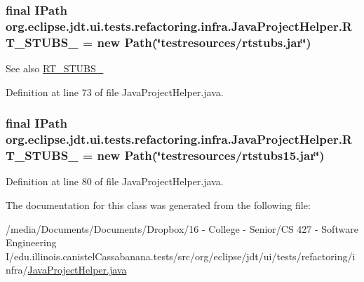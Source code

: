\hypertarget{classorg_1_1eclipse_1_1jdt_1_1ui_1_1tests_1_1refactoring_1_1infra_1_1JavaProjectHelper_a25c1dc7863be515c696975db13e6908e}{
\subsubsection[{RT\_\-STUBS\_\-13}]{\setlength{\rightskip}{0pt plus 5cm}final IPath {\bf org.eclipse.jdt.ui.tests.refactoring.infra.JavaProjectHelper.RT\_\-STUBS\_} = new Path(\char`\"{}testresources/rtstubs.jar\char`\"{})}}
\label{classorg_1_1eclipse_1_1jdt_1_1ui_1_1tests_1_1refactoring_1_1infra_1_1JavaProjectHelper_a25c1dc7863be515c696975db13e6908e}
\begin{DoxySeeAlso}{See also}
\hyperlink{classorg_1_1eclipse_1_1jdt_1_1ui_1_1tests_1_1refactoring_1_1infra_1_1JavaProjectHelper_ab9682099e6b3300bd32cf650a6bb9b8a}{RT\_\-STUBS\_} 
\end{DoxySeeAlso}


Definition at line 73 of file JavaProjectHelper.java.

\hypertarget{classorg_1_1eclipse_1_1jdt_1_1ui_1_1tests_1_1refactoring_1_1infra_1_1JavaProjectHelper_ab9682099e6b3300bd32cf650a6bb9b8a}{
\subsubsection[{RT\_\-STUBS\_\-15}]{\setlength{\rightskip}{0pt plus 5cm}final IPath {\bf org.eclipse.jdt.ui.tests.refactoring.infra.JavaProjectHelper.RT\_\-STUBS\_} = new Path(\char`\"{}testresources/rtstubs15.jar\char`\"{})}}
\label{classorg_1_1eclipse_1_1jdt_1_1ui_1_1tests_1_1refactoring_1_1infra_1_1JavaProjectHelper_ab9682099e6b3300bd32cf650a6bb9b8a}


Definition at line 80 of file JavaProjectHelper.java.



The documentation for this class was generated from the following file:\begin{DoxyCompactItemize}
\item 
/media/Documents/Documents/Dropbox/16 -\/ College -\/ Senior/CS 427 -\/ Software Engineering I/edu.illinois.canistelCassabanana.tests/src/org/eclipse/jdt/ui/tests/refactoring/infra/\hyperlink{JavaProjectHelper_8java}{JavaProjectHelper.java}\end{DoxyCompactItemize}

